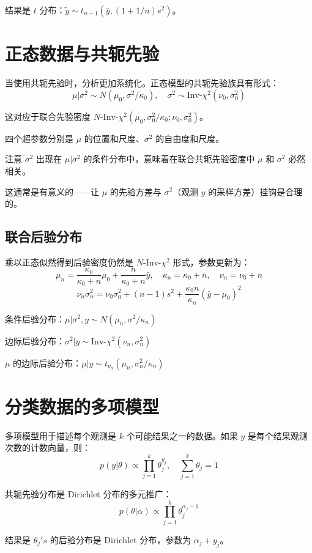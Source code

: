 结果是 $t$ 分布：$\tilde{y} \sim t_{n-1}(\bar{y}, (1+1/n)s^2)$。

\section{正态数据与共轭先验}

当使用共轭先验时，分析更加系统化。正态模型的共轭先验族具有形式：
\[
\mu | \sigma^2 \sim N(\mu_0, \sigma^2/\kappa_0), \quad \sigma^2 \sim \text{Inv-}\chi^2(\nu_0, \sigma_0^2)
\]

这对应于联合先验密度 $N\text{-Inv-}\chi^2(\mu_0, \sigma_0^2/\kappa_0; \nu_0, \sigma_0^2)$。

四个超参数分别是 $\mu$ 的位置和尺度、$\sigma^2$ 的自由度和尺度。

注意 $\sigma^2$ 出现在 $\mu|\sigma^2$ 的条件分布中，意味着在联合共轭先验密度中 $\mu$ 和 $\sigma^2$ 必然相关。

这通常是有意义的——让 $\mu$ 的先验方差与 $\sigma^2$（观测 $y$ 的采样方差）挂钩是合理的。

\subsection{联合后验分布}

乘以正态似然得到后验密度仍然是 $N\text{-Inv-}\chi^2$ 形式，参数更新为：
\[
\mu_n = \frac{\kappa_0}{\kappa_0+n}\mu_0 + \frac{n}{\kappa_0+n}\bar{y}, \quad
\kappa_n = \kappa_0 + n, \quad
\nu_n = \nu_0 + n
\]
\[
\nu_n\sigma_n^2 = \nu_0\sigma_0^2 + (n-1)s^2 + \frac{\kappa_0 n}{\kappa_n}(\bar{y}-\mu_0)^2
\]

条件后验分布：$\mu | \sigma^2, y \sim N(\mu_n, \sigma^2/\kappa_n)$

边际后验分布：$\sigma^2 | y \sim \text{Inv-}\chi^2(\nu_n, \sigma_n^2)$

$\mu$ 的边际后验分布：$\mu | y \sim t_{\nu_n}(\mu_n, \sigma_n^2/\kappa_n)$

\section{分类数据的多项模型}

多项模型用于描述每个观测是 $k$ 个可能结果之一的数据。如果 $y$ 是每个结果观测次数的计数向量，则：
\[
p(y|\theta) \propto \prod_{j=1}^k \theta_j^{y_j}, \quad \sum_{j=1}^k \theta_j = 1
\]

共轭先验分布是 Dirichlet 分布的多元推广：
\[
p(\theta|\alpha) \propto \prod_{j=1}^k \theta_j^{\alpha_j-1}
\]

结果是 $\theta_j' s$ 的后验分布是 Dirichlet 分布，参数为 $\alpha_j + y_j$。

